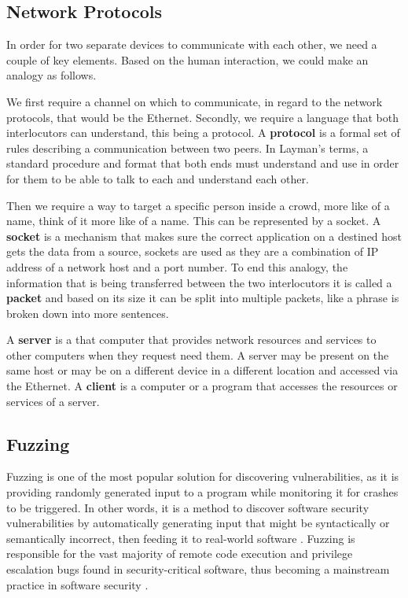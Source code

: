 \documentclass[10pt,a4paper,english,onecolumn]{IEEEtran}
\begin{document}
\subsection{Network Protocols}

In order for two separate devices to communicate with each other, we need a couple of key elements. Based on the human interaction, we could make an analogy as follows.

We first require a channel on which to communicate, in regard to the network protocols, that would be the Ethernet. Secondly, we require a language that both interlocutors can understand, this being a protocol. A \textbf{protocol} is a formal set of rules describing a communication between two peers. In Layman’s terms, a standard procedure and format that both ends must understand and use in order for them to be able to talk to each and understand each other.

Then we require a way to target a specific person inside a crowd, more like of a name, think of it more like of a name. This can be represented by a socket. A \textbf{socket} is a mechanism that makes sure the correct application on a destined host gets the data from a source, sockets are used as they are a combination of IP address of a network host and a port number. To end this analogy, the information that is being transferred between the two interlocutors it is called a \textbf{packet} and based on its size it can be split into multiple packets, like a phrase is broken down into more sentences.

A \textbf{server} is a that computer that provides network resources and services to other computers when they request need them. A server may be present on the same host or may be on a different device in a different location and accessed via the Ethernet. A \textbf{client} is a computer or a program that accesses the resources or services of a server.

\subsection{Fuzzing}

Fuzzing is one of the most popular solution for discovering vulnerabilities, as it is providing randomly generated input to a program while monitoring it for crashes to be triggered. In other words, it is a method to discover software security vulnerabilities by automatically generating input that might be syntactically or semantically incorrect, then feeding it to real-world software \cite{fuzzing_survey}. Fuzzing is responsible for the vast majority of remote code execution and privilege escalation bugs found in security-critical software, thus becoming a mainstream practice in software security \cite{aflnet_paper}.
\end{document}
